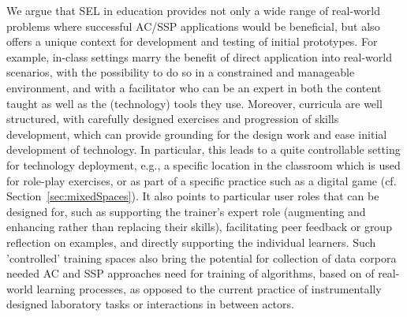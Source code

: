 \documentclass[prodmode,acmtochi]{acmsmall}
\begin{document}
We argue that SEL in education provides not only a wide range of real-world problems where successful AC/SSP applications would be beneficial, but also offers a unique context for development and testing of initial prototypes. For example, in-class settings marry the benefit of direct application into real-world scenarios, with the possibility to do so in a constrained and manageable environment, and with a facilitator who can be an expert in both the content taught as well as the (technology) tools they use. Moreover, curricula are well structured, with carefully designed exercises and progression of skills development, which can provide grounding for the design work and ease initial development of technology. In particular, this leads to a quite controllable setting for technology deployment, e.g., a specific location in the classroom which is used for role-play exercises, or as part of a specific practice such as a digital game (cf. Section~\ref{sec:mixedSpaces}). It also points to particular user roles that can be designed for, such as supporting the trainer's expert role (augmenting and enhancing rather than replacing their skills), facilitating peer feedback or group reflection on examples, and directly supporting the individual learners.  Such 'controlled' training spaces also bring the potential for collection of data corpora needed AC and SSP approaches need for training of algorithms, based on of real-world learning processes, as opposed to the current practice of instrumentally designed laboratory tasks or interactions in between actors.  



\end{document}
